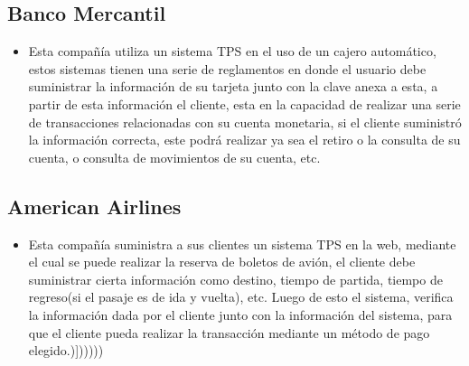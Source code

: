 \subsection{Banco Mercantil}
\begin{itemize}
\item Esta compañía utiliza un sistema TPS en el uso de un cajero automático, estos sistemas tienen una serie de reglamentos en donde el usuario debe suministrar la información de su tarjeta junto con la clave anexa a esta, a partir de esta información el cliente, esta en la capacidad de realizar una serie de transacciones relacionadas con su cuenta monetaria, si el cliente suministró la información correcta, este podrá realizar ya sea el retiro o la consulta de su cuenta, o consulta de movimientos de su cuenta, etc.
\end{itemize}
\subsection{American Airlines}
\begin{itemize}
\item Esta compañía suministra a sus clientes un sistema TPS en la web, mediante el cual se puede realizar la reserva de boletos de avión, el cliente debe suministrar cierta información como destino, tiempo de partida, tiempo de regreso(si el pasaje es de ida y vuelta), etc. Luego de esto el sistema, verifica la información dada por el cliente junto con la información del sistema, para que el cliente pueda realizar la transacción mediante un método de pago elegido.)])))))
\end{itemize}
